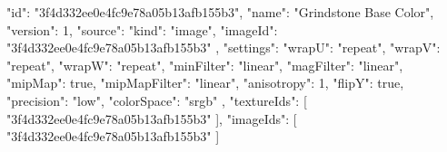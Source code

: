 {
  "id": "3f4d332ee0e4fc9e78a05b13afb155b3",
  "name": "Grindstone Base Color",
  "version": 1,
  "source": {
    "kind": "image",
    "imageId": "3f4d332ee0e4fc9e78a05b13afb155b3"
  },
  "settings": {
    "wrapU": "repeat",
    "wrapV": "repeat",
    "wrapW": "repeat",
    "minFilter": "linear",
    "magFilter": "linear",
    "mipMap": true,
    "mipMapFilter": "linear",
    "anisotropy": 1,
    "flipY": true,
    "precision": "low",
    "colorSpace": "srgb"
  },
  "textureIds": [
    "3f4d332ee0e4fc9e78a05b13afb155b3"
  ],
  "imageIds": [
    "3f4d332ee0e4fc9e78a05b13afb155b3"
  ]
}
